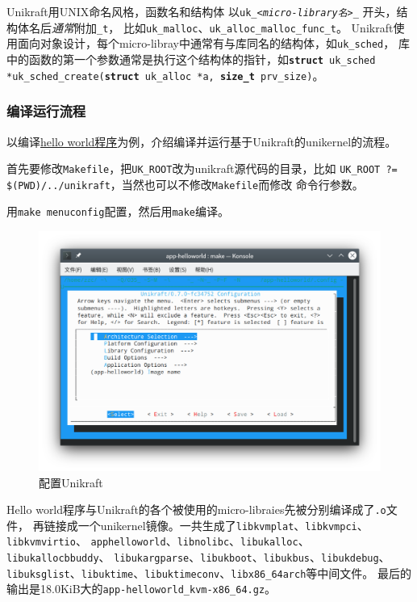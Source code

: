 \documentclass[UTF8,fontset=none,linespread=1.15]{ctexart}
\begin{document}
Unikraft用UNIX命名风格，函数名和结构体
以\texttt{uk\_\hspace{0cm}\textit{<micro-library\hspace{0cm}名\hspace{0cm}>}\hspace{0cm}\_}
开头，结构体名后\textit{通常}附加\texttt{\_t}，
比如\texttt{uk\_malloc}、\texttt{uk\_alloc\_malloc\_func\_t}。
Unikraft使用面向对象设计，每个micro-libray中通常有与库同名的结构体，如\texttt{uk\_sched}，
库中的函数的第一个参数通常是执行这个结构体的指针，如\texttt{\textbf{struct} uk\_sched *uk\_sched\_create(\textbf{struct} uk\_alloc *a, \textbf{size\_t} prv\_size)}。

\subsubsection{编译运行流程}
以编译\href{https://github.com/unikraft/app-helloworld}{hello world程序}为例，介绍编译并运行基于Unikraft的unikernel的流程。

首先要修改\texttt{Makefile}，把\texttt{UK\_ROOT}改为unikraft源代码的目录，比如
\texttt{UK\_ROOT ?= \linebreak\$(PWD)/../unikraft}，当然也可以不修改\texttt{Makefile}而修改
命令行参数。

用\texttt{make menuconfig}配置，然后用\texttt{make}编译。
\begin{figure}[!hbt]
\centering
\includegraphics[width=0.9\linewidth]{assets/unikraft-menuconfig}
\caption{配置Unikraft}
\label{fig:unikraft-menuconfig}
\end{figure}
Hello world程序与Unikraft的各个被使用的micro-libraies先被分别编译成了\texttt{.o}文件，
再链接成一个unikernel镜像。一共生成了\texttt{libkvmplat}、\texttt{libkvmpci}、\texttt{libkvmvirtio}、
\texttt{apphelloworld}、\texttt{libnolibc}、\texttt{libukalloc}、\texttt{libukallocbbuddy}、
\texttt{libukargparse}、\texttt{libukboot}、\texttt{libukbus}、\texttt{libukdebug}、
\texttt{libuksglist}、\texttt{libuktime}、\texttt{libuktimeconv}、\texttt{libx86\_64arch}等中间文件。
最后的输出是18.0KiB大的\texttt{app-\linebreak helloworld\_kvm-x86\_64.gz}。
\end{document}
